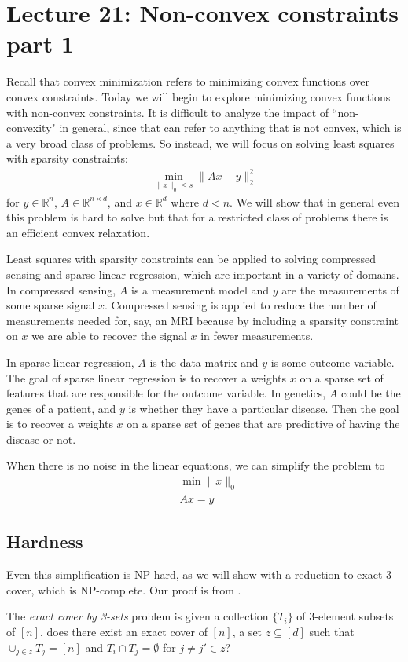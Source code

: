 \section{Lecture 21: Non-convex constraints part 1}
Recall that convex minimization refers to minimizing convex functions over convex constraints. Today we will begin to explore minimizing convex functions with non-convex constraints. It is difficult to analyze the impact of ``non-convexity" in general, since that can refer to anything that is not convex, which is a very broad class of problems. So instead, we will focus on solving least squares with sparsity constraints:
\begin{align*}
    \min_{\|x\|_0 \leq s} \|Ax-y\|^2_2
\end{align*}
for $y \in \mathbb{R}^{n}$, $A \in \mathbb{R}^{n \times d}$, and $x \in \mathbb{R}^{d}$ where $d < n$. We will show that in general even this problem is hard to solve but that for a restricted class of problems there is an efficient convex relaxation.

Least squares with sparsity constraints can be applied to solving compressed sensing and sparse linear regression, which are important in a variety of domains. In compressed sensing, $A$ is a measurement model and $y$ are the measurements of some sparse signal $x$. Compressed sensing is applied to reduce the number of measurements needed for, say, an MRI because by including a sparsity constraint on $x$ we are able to recover the signal $x$ in fewer measurements.

In sparse linear regression, $A$ is the data matrix and $y$ is some outcome variable. The goal of sparse linear regression is to recover a weights $x$ on a sparse set of features that are responsible for the outcome variable. In genetics, $A$ could be the genes of a patient, and $y$ is whether they have a particular disease. Then the goal is to recover a weights $x$ on a sparse set of genes that are predictive of having the disease or not.

When there is no noise in the linear equations, we can simplify the problem to
\begin{align*}
    & \min \|x\|_0 \\
    &  Ax = y
\end{align*}

\subsection{Hardness}
Even this simplification is NP-hard, as we will show with a reduction to exact 3-cover, which is NP-complete. Our proof is from \cite{foucart2013mathematical}.
\begin{definition}
The \textit{exact cover by 3-sets} problem is given a collection $\{T_i\}$ of 3-element subsets of $[n]$, does there exist an exact cover of $[n]$, a set $z \subseteq [d]$ such that $\cup_{j \in z} T_j = [n]$ and $T_i \cap T_j = \emptyset$ for $j \neq j' \in z$?
\end{definition}

